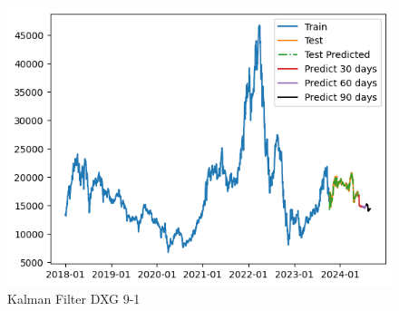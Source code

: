 \documentclass[conference]{IEEEtran}
\begin{document}
\begin{figure}[htbp]
\begin{minipage}{0.23\textwidth}
    \includegraphics[width=1\textwidth]{experiment/kf/DXG 9-1.png}
    \caption{Kalman Filter DXG 9-1}
    \label{fig:nvl_histogram}
    \end{minipage}


\end{figure}
\end{document}
